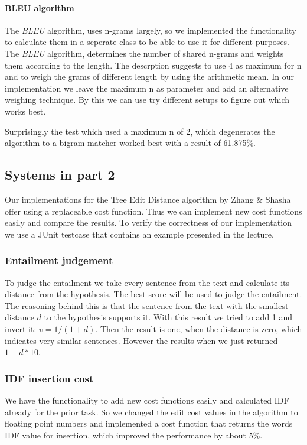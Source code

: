 \paragraph{BLEU algorithm}
The \textit{BLEU} algorithm, uses n-grams largely, so we implemented the functionality to
calculate them in a seperate class to be able to use it for different purposes.
The \textit{BLEU} algorithm, determines the number of shared n-grams and weights them
according to the length. The descrption suggests to use 4 as maximum for n and to weigh
the grams of different length by using the arithmetic mean. In our implementation we leave
the maximum n as parameter and add an alternative weighing technique. By this we can use
try different setups to figure out which works best. 

Surprisingly the test which used a maximum n of 2, which degenerates the algorithm to a
bigram matcher worked best with a result of 61.875\%.

\subsection{Systems in part 2}
Our implementations for the Tree Edit Distance algorithm by Zhang \& Shasha offer using
a replaceable cost function. Thus we can implement new cost functions easily and compare
the results. To verify the correctness of our implementation we use a JUnit testcase that
contains an example presented in the lecture.

\subsubsection{Entailment judgement}

To judge the entailment we take every sentence from the text and calculate its distance from 
the hypothesis. The best score will be used to judge the entailment. The reasoning behind this
is that the sentence from the text with the smallest distance $d$ to the hypothesis supports it.
With this result we tried to add 1 and invert it: $v=1/(1+d)$. Then the result is one, when
the distance is zero, which indicates very similar sentences. However the results when we just
returned $1-d*10$.

\subsubsection{IDF insertion cost}
We have the functionality to add new cost functions easily and calculated IDF already for the prior
task. So we changed the edit cost values in the algorithm to floating point numbers and implemented 
a cost function that returns the words IDF value for insertion, which improved the performance by about 5\%.

